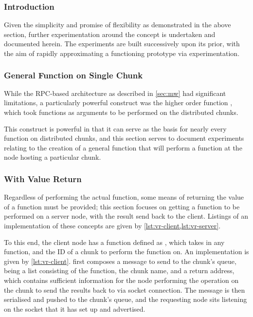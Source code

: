 \subsubsection{Introduction}

Given the simplicity and promise of flexibility as demonstrated in the
above section,
further experimentation around the concept is undertaken and documented herein.
The experiments are built successively upon its prior, with the aim of rapidly
approximating a functioning prototype via experimentation.

\subsubsection{General Function on Single Chunk}

While the RPC-based architecture as described in \cref{sec:mw}
had significant limitations, a particularly powerful construct was the higher
order function , which took functions as arguments
to be performed on the distributed chunks.

This construct is powerful in that it can serve as the basis for nearly every
function on distributed chunks, and this section serves to document experiments
relating to the creation of a general function that will perform a function at
the node hosting a particular chunk.

\subsubsection{With Value Return}\label{sec:val-ret}

Regardless of performing the actual function, some means of returning the value
of a function must be provided; this section focuses on getting a function to
be performed on a server node, with the result send back to the client.
Listings of an implementation of these concepts are given by \cref{lst:vr-client,lst:vr-server}.



To this end, the client node has a function defined as , which takes in any function, and the ID of a chunk to perform the
function on.
An implementation is given by \cref{lst:vr-client}.
 first composes a message to send to the chunk's queue, being a
list consisting of the function, the chunk name, and a return address, which
contains sufficient information for the node performing the operation on the
chunk to send the results back to via socket connection.
The message is then serialised and pushed to the chunk's queue, and the
requesting node sits listening on the socket that it has set up and advertised.

